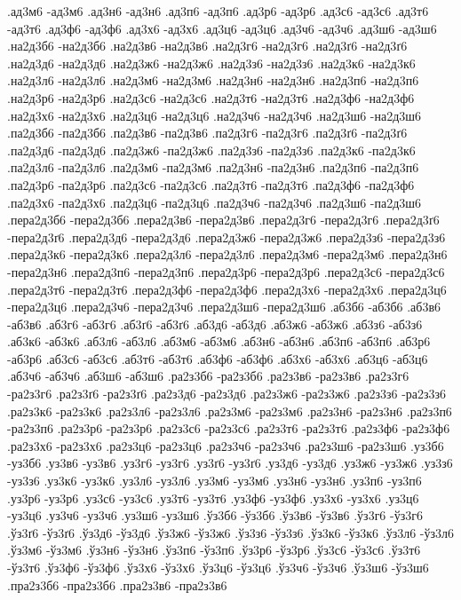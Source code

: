 {.ад3м6 -ад3м6
.ад3н6 -ад3н6
.ад3п6 -ад3п6
.ад3р6 -ад3р6
.ад3с6 -ад3с6
.ад3т6 -ад3т6
.ад3ф6 -ад3ф6
.ад3х6 -ад3х6
.ад3ц6 -ад3ц6
.ад3ч6 -ад3ч6
.ад3ш6 -ад3ш6
.на2д3б6 -на2д3б6
.на2д3в6 -на2д3в6
.на2д3г6 -на2д3г6
.на2д3ґ6 -на2д3ґ6
.на2д3д6 -на2д3д6
.на2д3ж6 -на2д3ж6
.на2д3з6 -на2д3з6
.на2д3к6 -на2д3к6
.на2д3л6 -на2д3л6
.на2д3м6 -на2д3м6
.на2д3н6 -на2д3н6
.на2д3п6 -на2д3п6
.на2д3р6 -на2д3р6
.на2д3с6 -на2д3с6
.на2д3т6 -на2д3т6
.на2д3ф6 -на2д3ф6
.на2д3х6 -на2д3х6
.на2д3ц6 -на2д3ц6
.на2д3ч6 -на2д3ч6
.на2д3ш6 -на2д3ш6
.па2д3б6 -па2д3б6
.па2д3в6 -па2д3в6
.па2д3г6 -па2д3г6
.па2д3ґ6 -па2д3ґ6
.па2д3д6 -па2д3д6
.па2д3ж6 -па2д3ж6
.па2д3з6 -па2д3з6
.па2д3к6 -па2д3к6
.па2д3л6 -па2д3л6
.па2д3м6 -па2д3м6
.па2д3н6 -па2д3н6
.па2д3п6 -па2д3п6
.па2д3р6 -па2д3р6
.па2д3с6 -па2д3с6
.па2д3т6 -па2д3т6
.па2д3ф6 -па2д3ф6
.па2д3х6 -па2д3х6
.па2д3ц6 -па2д3ц6
.па2д3ч6 -па2д3ч6
.па2д3ш6 -па2д3ш6
.пера2д3б6 -пера2д3б6
.пера2д3в6 -пера2д3в6
.пера2д3г6 -пера2д3г6
.пера2д3ґ6 -пера2д3ґ6
.пера2д3д6 -пера2д3д6
.пера2д3ж6 -пера2д3ж6
.пера2д3з6 -пера2д3з6
.пера2д3к6 -пера2д3к6
.пера2д3л6 -пера2д3л6
.пера2д3м6 -пера2д3м6
.пера2д3н6 -пера2д3н6
.пера2д3п6 -пера2д3п6
.пера2д3р6 -пера2д3р6
.пера2д3с6 -пера2д3с6
.пера2д3т6 -пера2д3т6
.пера2д3ф6 -пера2д3ф6
.пера2д3х6 -пера2д3х6
.пера2д3ц6 -пера2д3ц6
.пера2д3ч6 -пера2д3ч6
.пера2д3ш6 -пера2д3ш6
.аб3б6 -аб3б6
.аб3в6 -аб3в6
.аб3г6 -аб3г6
.аб3ґ6 -аб3ґ6
.аб3д6 -аб3д6
.аб3ж6 -аб3ж6
.аб3з6 -аб3з6
.аб3к6 -аб3к6
.аб3л6 -аб3л6
.аб3м6 -аб3м6
.аб3н6 -аб3н6
.аб3п6 -аб3п6
.аб3р6 -аб3р6
.аб3с6 -аб3с6
.аб3т6 -аб3т6
.аб3ф6 -аб3ф6
.аб3х6 -аб3х6
.аб3ц6 -аб3ц6
.аб3ч6 -аб3ч6
.аб3ш6 -аб3ш6
.ра2з3б6 -ра2з3б6
.ра2з3в6 -ра2з3в6
.ра2з3г6 -ра2з3г6
.ра2з3ґ6 -ра2з3ґ6
.ра2з3д6 -ра2з3д6
.ра2з3ж6 -ра2з3ж6
.ра2з3з6 -ра2з3з6
.ра2з3к6 -ра2з3к6
.ра2з3л6 -ра2з3л6
.ра2з3м6 -ра2з3м6
.ра2з3н6 -ра2з3н6
.ра2з3п6 -ра2з3п6
.ра2з3р6 -ра2з3р6
.ра2з3с6 -ра2з3с6
.ра2з3т6 -ра2з3т6
.ра2з3ф6 -ра2з3ф6
.ра2з3х6 -ра2з3х6
.ра2з3ц6 -ра2з3ц6
.ра2з3ч6 -ра2з3ч6
.ра2з3ш6 -ра2з3ш6
.уз3б6 -уз3б6
.уз3в6 -уз3в6
.уз3г6 -уз3г6
.уз3ґ6 -уз3ґ6
.уз3д6 -уз3д6
.уз3ж6 -уз3ж6
.уз3з6 -уз3з6
.уз3к6 -уз3к6
.уз3л6 -уз3л6
.уз3м6 -уз3м6
.уз3н6 -уз3н6
.уз3п6 -уз3п6
.уз3р6 -уз3р6
.уз3с6 -уз3с6
.уз3т6 -уз3т6
.уз3ф6 -уз3ф6
.уз3х6 -уз3х6
.уз3ц6 -уз3ц6
.уз3ч6 -уз3ч6
.уз3ш6 -уз3ш6
.ўз3б6 -ўз3б6
.ўз3в6 -ўз3в6
.ўз3г6 -ўз3г6
.ўз3ґ6 -ўз3ґ6
.ўз3д6 -ўз3д6
.ўз3ж6 -ўз3ж6
.ўз3з6 -ўз3з6
.ўз3к6 -ўз3к6
.ўз3л6 -ўз3л6
.ўз3м6 -ўз3м6
.ўз3н6 -ўз3н6
.ўз3п6 -ўз3п6
.ўз3р6 -ўз3р6
.ўз3с6 -ўз3с6
.ўз3т6 -ўз3т6
.ўз3ф6 -ўз3ф6
.ўз3х6 -ўз3х6
.ўз3ц6 -ўз3ц6
.ўз3ч6 -ўз3ч6
.ўз3ш6 -ўз3ш6
.пра2з3б6 -пра2з3б6
.пра2з3в6 -пра2з3в6
}

